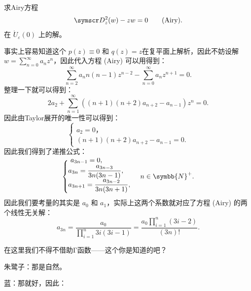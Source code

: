\begin{tcolorbox}[colback=gray!20,colframe=gray!150,fonttitle=\bfseries,arc=0mm,leftrule=1mm,toprule=0mm,bottomrule=0mm,rightrule=0mm]
	求Airy方程
	\[
		\ddw -zw=0 \tag{Airy}
		.\]
	在 \( \mathring{U}_{\varepsilon }(0)\) 上的解。
	\tcbline

	事实上容易知道这个 \(p(z)\equiv 0\) 和 \(q(z) =z\)在复平面上解析，因此不妨设解 \(w=\sum_{n=0}^{\infty} a_n z^n\)，因此代入方程 (Airy) 可以用得到：
	\[
		\sum_{n=2}^{\infty} a_n n(n-1) z^{n-2}-\sum_{n=0}^{\infty} a_n z^{n+1}=0
		.\]
	整理一下就可以得到：
	\[
		2a_2+\sum_{n=1}^{\infty} ( (n+1)(n+2)a_{n+2}-a_{n-1})z^{n}=0
		.\]
	因此由Taylor展开的唯一性可以得到：
	\[
		\begin{cases}
			\\[-2.2em]
			a_2=0， \\
			(n+1)(n+2)a_{n+2}-a_{n-1}=0.
		\end{cases}
	\]
	因此我们得到了递推公式：
	\[
		\begin{cases}
			\\[-2.2em]\
			a_{3n-1}=0,                         \\
			a_{3n}= \dfrac{a_{3n-3}}{3n(3n-1)}, \\
			a_{3n+1}= \dfrac{a_{3n-2}}{3n(3n+1)},
		\end{cases}\, n\in\symbb{N} ^+.
	\]
	因此我们要考量的其实是 \(a_0\) 和 \(a_1\)，实际上这两个系数就对应了方程 (Airy) 的两个线性无关解：
	\[
		a_{3n}= \frac{a_0}{\prod_{i=1}^{n} 3i(3i-1) } = \frac{a_0\prod_{i=1}^{n} (3i-2)}{(3n)!}
		.\]
\end{tcolorbox}

在这里我们不得不借助Γ函数——这个你是知道的吧？


朱鹭子：那是自然。


蓝：那就好，因此：


